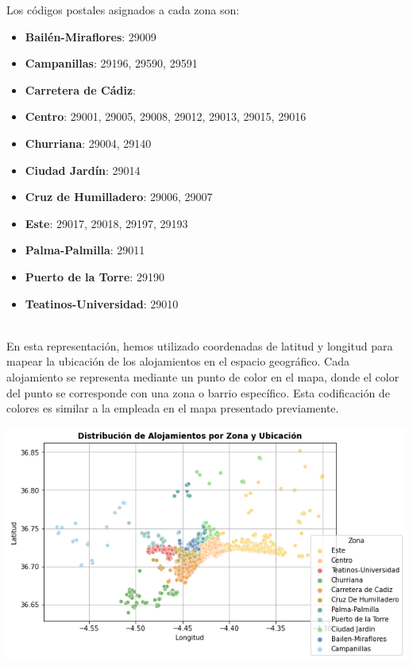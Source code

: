 Los códigos postales asignados a cada zona son:
\begin{itemize}
    \item \textbf{Bailén-Miraflores}: 29009
    \item \textbf{Campanillas}: 29196, 29590, 29591
    \item \textbf{Carretera de Cádiz}: 
    \item \textbf{Centro}: 29001, 29005, 29008, 29012, 29013, 29015, 29016
    \item \textbf{Churriana}: 29004, 29140
    \item \textbf{Ciudad Jardín}: 29014
    \item \textbf{Cruz de Humilladero}: 29006, 29007
    \item \textbf{Este}: 29017, 29018, 29197, 29193
    \item \textbf{Palma-Palmilla}: 29011
    \item \textbf{Puerto de la Torre}: 29190
    \item \textbf{Teatinos-Universidad}: 29010
\end{itemize}
\ \\
En esta representación, hemos utilizado coordenadas de latitud y longitud para mapear la ubicación de los alojamientos en el espacio geográfico. Cada alojamiento se representa mediante un punto de color en el mapa, donde el color del punto se corresponde con una zona o barrio específico. Esta codificación de colores es similar a la empleada en el mapa presentado previamente.
\begin{center}
    \centering
    \includegraphics[width=1\textwidth]{capturas/3.png}
\end{center}
\ \\

